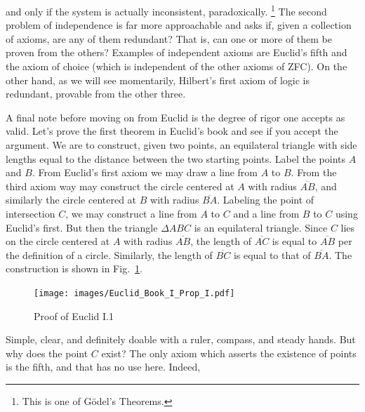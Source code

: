         and only if the system is actually inconsistent, paradoxically.%
        \footnote{%
            This is one of G\"{o}del's Theorems.
        }
        The second problem of independence is far more approachable and asks if,
        given a collection of axioms, are any of them redundant? That is, can
        one or more of them be proven from the others? Examples of independent
        axioms are Euclid's fifth and the axiom of choice (which is independent
        of the other axioms of ZFC). On the other hand, as we will see
        momentarily, Hilbert's first axiom of logic is redundant, provable from
        the other three.
        \par\hfill\par
        A final note before moving on from Euclid is the degree of rigor one
        accepts as valid. Let's prove the first theorem in Euclid's book and see
        if you accept the argument. We are to construct, given two points, an
        equilateral triangle with side lengths equal to the distance between the
        two starting points. Label the points $A$ and $B$. From Euclid's first
        axiom we may draw a line from $A$ to $B$. From the third axiom way may
        construct the circle centered at $A$ with radius $\overline{AB}$, and
        similarly the circle centered at $B$ with radius $\overline{BA}$.
        Labeling the point of intersection $C$, we may construct a line from $A$
        to $C$ and a line from $B$ to $C$ using Euclid's first. But then the
        triangle $\Delta{ABC}$ is an equilateral triangle. Since $C$ lies on the
        circle centered at $A$ with radius $\overline{AB}$, the length of
        $\overline{AC}$ is equal to $\overline{AB}$ per the definition of a
        circle. Similarly, the length of $\overline{BC}$ is equal to that of
        $\overline{BA}$. The construction is shown in
        Fig.~\ref{fig:Euclid_I_1}.
        \par\hfill\par
        \begin{figure}
            \centering
            \captionsetup{type=figure}
            \texttt{[image: images/Euclid\_Book\_I\_Prop\_I.pdf]}
            \caption{Proof of Euclid I.1}
            \label{fig:Euclid_I_1}
        \end{figure}
        Simple, clear, and definitely doable with a ruler, compass, and steady
        hands. But why does the point $C$ exist? The only axiom which asserts
        the existence of points is the fifth, and that has no use here. Indeed,

